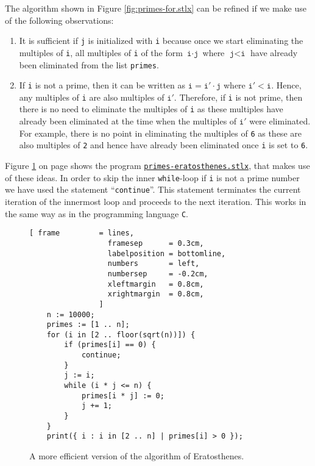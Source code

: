 The algorithm shown in Figure \ref{fig:primes-for.stlx} can be refined if we make use of the following observations:
\begin{enumerate}
\item It is sufficient if \texttt{j} is initialized with \texttt{i} because once we start eliminating the
      multiples of \texttt{i}, all multiples of \texttt{i} of the form $\texttt{i}\cdot\texttt{j}$ where
      $\texttt{j} < \texttt{i}$ have already been eliminated from the list \texttt{primes}. 
\item If \texttt{i} is not a prime, then it can be written as $\texttt{i} = \texttt{i}' \cdot\texttt{j}$ where
      $\texttt{i}' < \texttt{i}$.  Hence, any multiples of \texttt{i} are also multiples of $\texttt{i}'$.
      Therefore, if \texttt{i} is not prime, then there is no need to eliminate the multiples of
      \texttt{i} as these multiples have already been eliminated at the time when the multiples of
      $\texttt{i}'$ were eliminated.  For example, there is no point in eliminating the multiples of
      \texttt{6} as these are also multiples of \texttt{2} and hence have already been eliminated
      once \texttt{i} is set to \texttt{6}.
\end{enumerate}
Figure \ref{fig:primes-eratosthenes.stlx} on page \pageref{fig:primes-eratosthenes.stlx} shows the program
\href{https://github.com/karlstroetmann/Logik/blob/master/SetlX/primes-eratosthenes.stlx}{\texttt{primes-eratosthenes.stlx}}, 
that makes use of these ideas.  In order to skip the inner \texttt{while}-loop if \texttt{i} is not
a prime number we have used the statement ``\texttt{continue}''.  This statement terminates the
current iteration of the innermost loop and proceeds to the next iteration.  This works in the same way as in
the programming language \texttt{C}. 


\begin{figure}[!ht]
  \centering
\begin{Verbatim}[ frame         = lines, 
                  framesep      = 0.3cm, 
                  labelposition = bottomline,
                  numbers       = left,
                  numbersep     = -0.2cm,
                  xleftmargin   = 0.8cm,
                  xrightmargin  = 0.8cm,
                ]
    n := 10000;
    primes := [1 .. n];
    for (i in [2 .. floor(sqrt(n))]) {
        if (primes[i] == 0) {
            continue;
        }
        j := i;
        while (i * j <= n) {
            primes[i * j] := 0;
            j += 1;
        }
    }
    print({ i : i in [2 .. n] | primes[i] > 0 });
\end{Verbatim} 
\vspace*{-0.3cm}
\caption{A more efficient version of the algorithm of Eratosthenes.}  \label{fig:primes-eratosthenes.stlx}
\end{figure}


